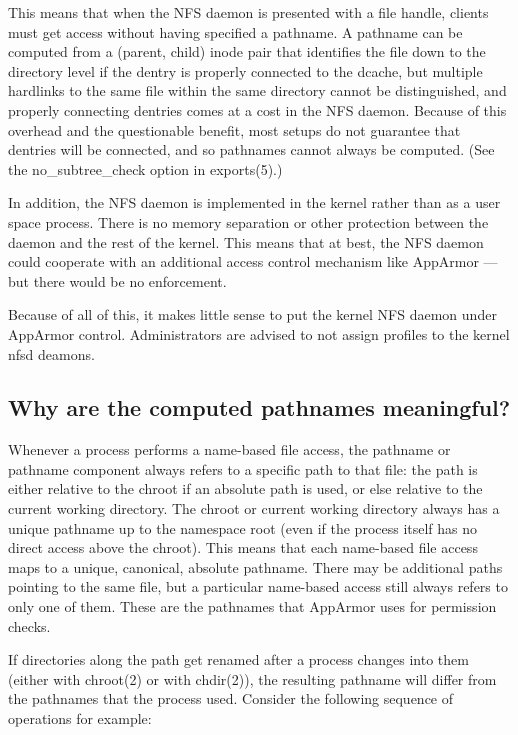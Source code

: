 \documentclass[a4paper]{article}
\begin{document}
This means that when the NFS daemon is presented with a file handle,
clients must get access without having specified a pathname.  A pathname
can be computed from a (parent, child) inode pair that identifies the
file down to the directory level if the dentry is properly connected to
the dcache, but multiple hardlinks to the same file within the same
directory cannot be distinguished, and properly connecting dentries
comes at a cost in the NFS daemon.  Because of this overhead and the
questionable benefit, most setups do not guarantee that dentries will be
connected, and so pathnames cannot always be computed.  (See the
no\_subtree\_check option in exports(5).)

In addition, the NFS daemon is implemented in the kernel rather than as
a user space process.  There is no memory separation or other protection
between the daemon and the rest of the kernel.  This means that at best,
the NFS daemon could cooperate with an additional access control
mechanism like AppArmor --- but there would be no enforcement.

Because of all of this, it makes little sense to put the kernel NFS
daemon under AppArmor control.  Administrators are advised to not assign
profiles to the kernel nfsd deamons.


\subsection{Why are the computed pathnames meaningful?}

Whenever a process performs a name-based file access, the pathname or
pathname component always refers to a specific path to that file: the
path is either relative to the chroot if an absolute path is used, or
else relative to the current working directory.  The chroot or current
working directory always has a unique pathname up to the namespace root
(even if the process itself has no direct access above the chroot).
This means that each name-based file access maps to a unique, canonical,
absolute pathname.  There may be additional paths pointing to the same
file, but a particular name-based access still always refers to only one
of them.  These are the pathnames that AppArmor uses for permission
checks.

If directories along the path get renamed after a process changes into
them (either with chroot(2) or with chdir(2)), the resulting pathname
will differ from the pathnames that the process used.  Consider the
following sequence of operations for example:
\end{document}
